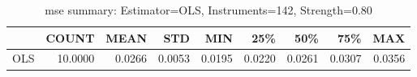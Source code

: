 \begin{table}[ht]
\centering
\caption{mse summary: Estimator=OLS, Instruments=142, Strength=0.80}
\begin{tabular}{lrrrrrrrr}
\toprule
 & COUNT & MEAN & STD & MIN & 25\% & 50\% & 75\% & MAX \\
\midrule
OLS & 10.0000 & 0.0266 & 0.0053 & 0.0195 & 0.0220 & 0.0261 & 0.0307 & 0.0356 \\
\bottomrule
\end{tabular}
\end{table}
